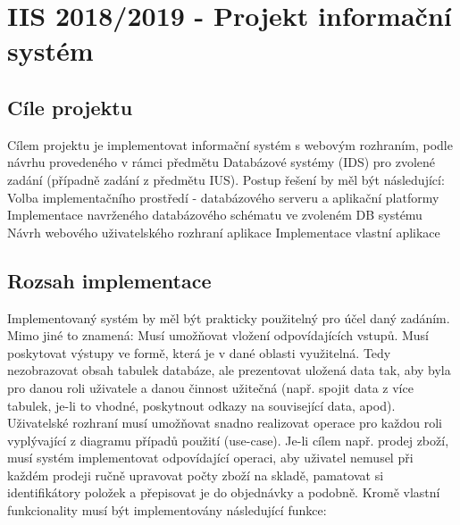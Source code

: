 \documentclass[11pt, a4paper, titlepage]{article}
\begin{document}
\section*{IIS 2018/2019 - Projekt informační systém}
\bigskip


\subsection*{Cíle projektu}

Cílem projektu je implementovat informační systém s webovým rozhraním, podle návrhu provedeného v rámci předmětu Databázové systémy (IDS) pro zvolené zadání (případně zadání z předmětu IUS). Postup řešení by měl být následující:
Volba implementačního prostředí - databázového serveru a aplikační platformy
Implementace navrženého databázového schématu ve zvoleném DB systému
Návrh webového uživatelského rozhraní aplikace
Implementace vlastní aplikace


\subsection*{Rozsah implementace}

Implementovaný systém by měl být prakticky použitelný pro účel daný zadáním. Mimo jiné to znamená:
Musí umožňovat vložení odpovídajících vstupů.
Musí poskytovat výstupy ve formě, která je v dané oblasti využitelná. Tedy nezobrazovat obsah tabulek databáze, ale prezentovat uložená data tak, aby byla pro danou roli uživatele a danou činnost užitečná (např. spojit data z více tabulek, je-li to vhodné, poskytnout odkazy na související data, apod).
Uživatelské rozhraní musí umožňovat snadno realizovat operace pro každou roli vyplývající z diagramu případů použití (use-case). Je-li cílem např. prodej zboží, musí systém implementovat odpovídající operaci, aby uživatel nemusel při každém prodeji ručně upravovat počty zboží na skladě, pamatovat si identifikátory položek a přepisovat je do objednávky a podobně.
Kromě vlastní funkcionality musí být implementovány následující funkce:
\end{document}
